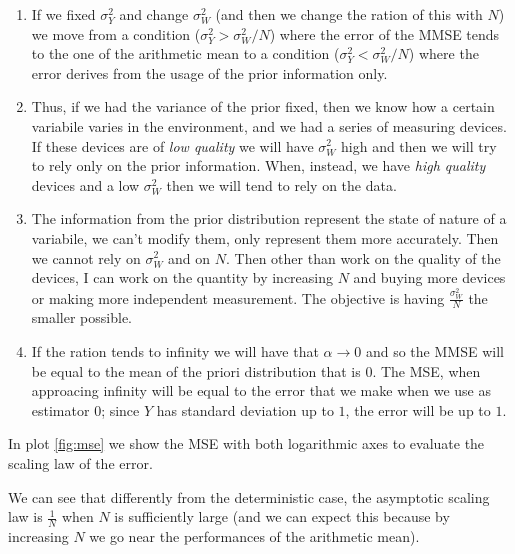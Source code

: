 


\begin{enumerate}
    \item If we fixed $\sigma^2_Y$ and change $\sigma_W^2$ (and then we change the ration of this with $N$) we move from a condition ($\sigma_Y^2>\sigma^2_W/N$) where the error of the MMSE tends to the one of the arithmetic mean to a condition ($\sigma_Y^2<\sigma^2_W/N$) where the error derives from the usage of the prior information only.
    \item Thus, if we had the variance of the prior fixed, then we know how a certain variabile varies in the environment, and we had a series of measuring devices. If these devices are of \textit{low quality} we will have $\sigma_W^2$ high and then we will try to rely only on the prior information. When, instead, we have \textit{high quality} devices and a low $\sigma^2_W$ then we will tend to rely on the data.
    \item The information from the prior distribution represent the state of nature of a variabile, we can't modify them, only represent them more accurately. Then we cannot rely on $\sigma^2_W$ and on $N$. Then other than work on the quality of the devices, I can work on the quantity by increasing $N$ and buying more devices or making more independent measurement. The objective is having $\frac{\sigma^2_W}{N}$ the smaller possible.
    \item If the ration tends to infinity we will have that $\alpha \to 0$ and so the MMSE will be equal to the mean of the priori distribution that is $0$. The MSE, when approacing infinity will be equal to the error that we make when we use as estimator $0$; since $Y$ has standard deviation up to $1$, the error will be up to $1$.
\end{enumerate}

In plot \ref{fig:mse} we show the MSE with both logarithmic axes to evaluate the scaling law of the error.


We can see that differently from the deterministic case, the asymptotic scaling law is $\frac{1}{N}$ when $N$ is sufficiently large (and we can expect this because by increasing $N$ we go near the performances of the arithmetic mean).


